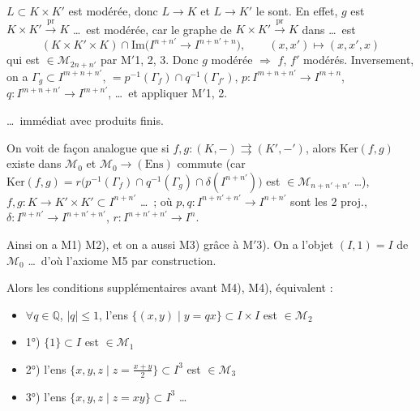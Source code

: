 \documentclass[11pt,a4paper]{article}
\begin{document}
\ill{} $L \subset K \times K'$ est modérée, donc \struck{\ill{}} $L \to K$
et $L \to K'$ le sont. En effet,  $g$ est $K
\times K' \xrightarrow{\mathrm{pr}} K$ \ldots\ est modérée, car le graphe
de $K \times K' \xrightarrow{\mathrm{pr}} K$ dans \ldots\ est
\[
  (K \times K' \times K) \cap \mathrm{Im}\bigl(I^{n+n'} \to
  I^{n+n'+n}\bigr), \qquad (x, x') \mapsto (x, x', x)
\]
qui est $\in \mathcal{M}_{2n+n'}$ par M$'$1, 2, 3. Donc $g$ modérée
$\Rightarrow$ $f$, $f'$ modérés. Inversement, on a $\Gamma_g \subset
I^{m+n+n'}$, $= p^{-1}(\Gamma_f) \cap q^{-1}(\Gamma_{f'})$, $p :
I^{m+n+n'} \to I^{m+n}$, $q : I^{m+n+n'} \to I^{m+n'}$, \ldots\ et
appliquer M$'$1, 2.

 \ldots\ immédiat avec
produits finis.

On voit de façon analogue que si $f, g : (K,-) \rightrightarrows (K',-')$,
alors $\mathrm{Ker}(f,g)$ existe dans $\mathcal{M}_0$ et $\mathcal{M}_0 \to
(\mathrm{Ens})$  commute (car $\mathrm{Ker}(f,g) =
r\bigl(p^{-1}(\Gamma_f) \cap q^{-1}(\Gamma_g) \cap \delta(I^{n+n'})\bigr)$
est $\in \mathcal{M}_{n+n'+n'}$ \ldots), \ $f, g : K \to K' \times K'
\subset I^{n+n'}$ \ldots\ ; où $p, q : I^{n+n'+n'} \to I^{n+n'}$ sont les 2
proj., $\delta : I^{n+n'} \to I^{n+n'+n'}$, $r : I^{n+n'+n'} \to I^n$.

Ainsi on a M1) M2), et on a aussi M3) grâce à M$'$3). On a l'objet $(I, 1) =
I$ de $\mathcal{M}_0$ \struck{\ill{}} \ldots\ d'où l'axiome M5 par
construction.

Alors les conditions supplémentaires \ill{} avant M4),  M4),
équivalent :
\begin{itemize}
  \item[M$'$4)] \struck{\ill{}} $\forall q \in \mathbb{Q}$, $|q| \leqslant
  1$, l'ens $\lbrace (x,y) \mid y = qx \rbrace \subset I \times I$ est $\in
  \mathcal{M}_2$
  \item[] 1°)  $\lbrace 1 \rbrace \subset I$ est $\in
  \mathcal{M}_1$
  \item[] 2°) l'ens $\lbrace x, y, z \mid z = \frac{x+y}{2} \rbrace \subset
  I^3$ est $\in \mathcal{M}_3$
  \item[] 3°) l'ens $\lbrace x, y, z \mid z = xy \rbrace \subset I^3$
  \ldots
\end{itemize}
\end{document}
